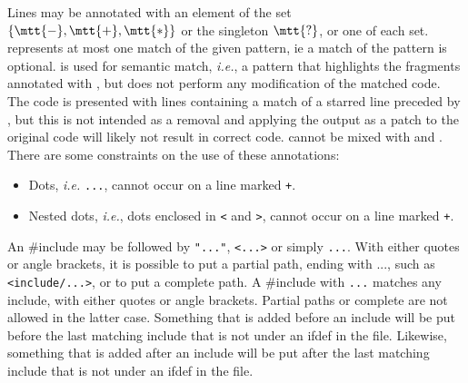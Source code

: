 \begin{grammar}
  \CASE{}


\end{grammar}

\noindent
Lines may be annotated with an element of the set $\{\mtt{-}, \mtt{+},
\mtt{*}\}$ or the singleton $\mtt{?}$, or one of each set. 
represents at most one match of the given pattern, ie a match of the
pattern is optional. \mtt{*} is used for
semantic match, \emph{i.e.}, a pattern that highlights the fragments
annotated with \mtt{*}, but does not perform any modification of the
matched code. The code is presented with lines containing a match of a
starred line preceded
by \mtt{-}, but this is not intended as a removal and applying the output
as a patch to the original code will likely not result in correct code.
\mtt{*} cannot be mixed with \mtt{-} and \mtt{+}.  There are
some constraints on the use of these annotations:
\begin{itemize}
\item Dots, {\em i.e.} \texttt{...}, cannot occur on a line marked
  \texttt{+}.
\item Nested dots, {\em i.e.}, dots enclosed in {\tt <} and {\tt >}, cannot
  occur on a line marked \texttt{+}.
\end{itemize}

An \#include may be followed by \texttt{"..."}, \texttt{<...>} or simply
\texttt{...}.  With either quotes or angle brackets, it is possible to put
a partial path, ending with ..., such as \texttt{<include/...>}, or to put a
complete path.  A \#include with \texttt{...} matches any include, with
either quotes or angle brackets.  Partial paths or complete are not allowed
in the latter case.  Something that is added before an include will be put
before the last matching include that is not under an ifdef in the file.
Likewise, something that is added after an include will be put after the
last matching include that is not under an ifdef in the file.

